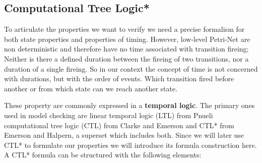 \subsection{Computational Tree Logic*}
\label{rel_ctl}
To articulate the properties we want to verify we need a precise formalism for both state properties and properties of timing.
However, low-level Petri-Net are non deterministic and therefore have no time associated with transition fireing;
Neither is there a defined duration between the fireing of two transitions, nor a duration of a single fireing.
So in our context the concept of time is not concerned with durations, but with the order of events.
Which transition fired before another or from which state can we reach another state.

These property are commonly expressed in a \textbf{temporal logic}.
The primary ones used in model checking are linear temporal logic (LTL) from Pnueli\cite{pnueli1977temporal} computational tree logic (CTL) from Clarke and Emerson\cite{clarke1981design} and CTL* from Emerson and Halpern\cite{emerson1985decision}, a superset which includes both.
Since we will later use CTL* to formulate our properties we will introduce its formula construction here.
A CTL* formula can be structured with the following elements:

